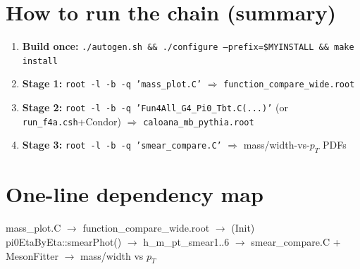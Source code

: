 \documentclass[11pt]{article}
\begin{document}
\section{How to run the chain (summary)}
\begin{enumerate}[nosep]
  \item \textbf{Build once:} \texttt{./autogen.sh \&\& ./configure --prefix=\$MYINSTALL \&\& make install}
  \item \textbf{Stage 1:} \texttt{root -l -b -q 'mass\_plot.C'} $\Rightarrow$ \texttt{function\_compare\_wide.root}
  \item \textbf{Stage 2:} \texttt{root -l -b -q 'Fun4All\_G4\_Pi0\_Tbt.C(...)'} (or \texttt{run\_f4a.csh}+Condor) $\Rightarrow$ \texttt{caloana\_mb\_pythia.root}
  \item \textbf{Stage 3:} \texttt{root -l -b -q 'smear\_compare.C'} $\Rightarrow$ mass/width-vs-$p_T$ PDFs
\end{enumerate}

\section*{One-line dependency map}
\begin{center}\small\ttfamily
mass\_plot.C $\to$ function\_compare\_wide.root $\to$ (Init) pi0EtaByEta::smearPhot()
$\to$ h\_m\_pt\_smear1..6 $\to$ smear\_compare.C + MesonFitter $\to$ mass/width vs $p_T$
\end{center}

\end{document}
